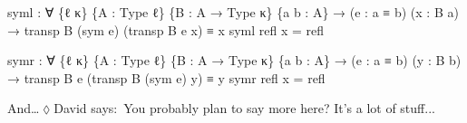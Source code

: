 \documentclass[
  11pt,
  oneside,
  article]{memoir}
\newenvironment{Shaded}{}{}
\newcommand{\NormalTok}[1]{#1}
\newcommand{\OtherTok}[1]{\textcolor[rgb]{0.00,0.44,0.13}{#1}}
\theoremstyle{definition}
\theoremstyle{plain}
\newcommand{\0}{\textsf{0}}
\newcommand{\1}{\tn{\textsf{1}}}
\newcommand{\dnote}[1]{{\quad \color{blue}$\lozenge$\;David says:}~#1\;{\color{blue}$\lozenge$}\quad}
\begin{document}
\begin{Shaded}
\begin{Highlighting}[]
\NormalTok{syml }\OtherTok{:} \OtherTok{∀} \OtherTok{\{}\NormalTok{ℓ κ}\OtherTok{\}} \OtherTok{\{}\NormalTok{A }\OtherTok{:}\NormalTok{ Type ℓ}\OtherTok{\}} \OtherTok{\{}\NormalTok{B }\OtherTok{:}\NormalTok{ A }\OtherTok{→}\NormalTok{ Type κ}\OtherTok{\}} \OtherTok{\{}\NormalTok{a b }\OtherTok{:}\NormalTok{ A}\OtherTok{\}}
       \OtherTok{→} \OtherTok{(}\NormalTok{e }\OtherTok{:}\NormalTok{ a ≡ b}\OtherTok{)} \OtherTok{(}\NormalTok{x }\OtherTok{:}\NormalTok{ B a}\OtherTok{)} \OtherTok{→}\NormalTok{ transp B }\OtherTok{(}\NormalTok{sym e}\OtherTok{)} \OtherTok{(}\NormalTok{transp B e x}\OtherTok{)}\NormalTok{ ≡ x}
\NormalTok{syml refl x }\OtherTok{=}\NormalTok{ refl}

\NormalTok{symr }\OtherTok{:} \OtherTok{∀} \OtherTok{\{}\NormalTok{ℓ κ}\OtherTok{\}} \OtherTok{\{}\NormalTok{A }\OtherTok{:}\NormalTok{ Type ℓ}\OtherTok{\}} \OtherTok{\{}\NormalTok{B }\OtherTok{:}\NormalTok{ A }\OtherTok{→}\NormalTok{ Type κ}\OtherTok{\}} \OtherTok{\{}\NormalTok{a b }\OtherTok{:}\NormalTok{ A}\OtherTok{\}}
       \OtherTok{→} \OtherTok{(}\NormalTok{e }\OtherTok{:}\NormalTok{ a ≡ b}\OtherTok{)} \OtherTok{(}\NormalTok{y }\OtherTok{:}\NormalTok{ B b}\OtherTok{)} \OtherTok{→}\NormalTok{ transp B e }\OtherTok{(}\NormalTok{transp B }\OtherTok{(}\NormalTok{sym e}\OtherTok{)}\NormalTok{ y}\OtherTok{)}\NormalTok{ ≡ y}
\NormalTok{symr refl x }\OtherTok{=}\NormalTok{ refl}
\end{Highlighting}
\end{Shaded}

And\ldots{}\dnote{You probably plan to say more here? It's a lot of stuff...}
\end{document}
